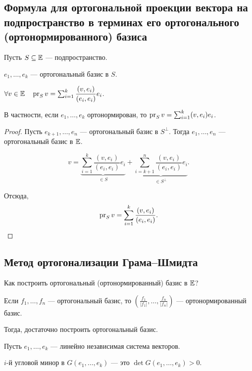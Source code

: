 \subsection{Формула для ортогональной проекции вектора на подпространство в терминах его ортогонального (ортонормированного) базиса}


Пусть $S \subseteq \mathbb{E}$ --- подпространство.

$e_1, \dots, e_k$ --- ортогональный базис в $S$.

\begin{proposal}
    $\forall v \in \mathbb{E} \quad \operatorname{\mathop{\mathrm{pr}}}_S v = \sum_{i = 1}^{k} \dfrac{(v, e_i)}{(e_i, e_i)} e_i$.

    В частности, если $e_1, \dots, e_k$ ортонормирован, то $\operatorname{\mathop{\mathrm{pr}}}_S v = \sum_{i = 1}^{k} (v, e_i) e_i$.
\end{proposal}

\begin{proof}
    Пусть $e_{k + 1}, \dots, e_n$ --- ортогональный базис в $S^{\perp}$. Тогда $e_1, \dots, e_n$ --- ортогональный базис в $\mathbb{E}$.

    \begin{equation*}
        v = \underbrace{\sum_{i = 1}^{k} \dfrac{(v, e_i)}{(e_i, e_i)} e_i}_{\in S} + \underbrace{\sum_{i = k + 1}^{n} \dfrac{(v, e_i)}{(e_i, e_i)} e_i}_{\in S^{\perp}}
    .\end{equation*}

    Отсюда,
    \begin{equation*}
        \operatorname{\mathop{\mathrm{pr}}}_S v = \sum_{i = 1}^{k} \dfrac{(v, e_i)}{(e_i, e_i)}
    .\qedhere\end{equation*}
\end{proof}


\subsection{Метод ортогонализации Грама–Шмидта}

Как построить ортогональный (ортонормированный) базис в $\mathbb{E}$?

Если $f_1, \dots, f_n$ --- ортогональный базис, то $\left(\frac{f_1}{|f_1|}, \dots, \frac{f_n}{|f_n|}\right)$ --- ортонормированный базис.

Тогда, достаточно построить ортогональный базис.

Пусть $e_1, \dots, e_k$ --- линейно независимая система векторов.

$i$-й угловой минор в $G(e_1, \dots, e_k)$ --- это $\det G(e_1, \dots, e_k) > 0$.

